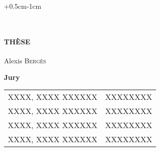 
\begin{titlepage}
\thispagestyle{empty}
\begin{adjustwidth}{+0.5cm}{-1cm}
\begin{center}
 \\
\vspace*{3.5cm}
 \\
\vspace*{2.5cm}
\noindent \large \textbf{TH\`ESE} \\
\vspace*{0.4cm}
 \\
\vspace*{0.3cm}
\noindent \Large Alexis \textsc{Bergès} \\
\vspace*{3.5cm}
\end{center}
\begin{center}
\noindent \large \textbf{Jury} \\
\vspace{0.6cm}
\noindent \normalsize
\begin{tabular}{ll}
XXXX, XXXX XXXXXX & XXXXXXXX\\
XXXX, XXXX XXXXXX & XXXXXXXX\\
XXXX, XXXX XXXXXX & XXXXXXXX\\
XXXX, XXXX XXXXXX & XXXXXXXX
\end{tabular}
\end{center}

\end{adjustwidth}
\end{titlepage}


\cleardoublepage
\titlepage

